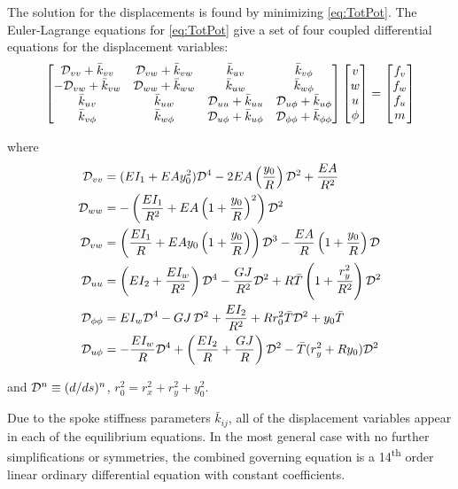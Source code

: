 \documentclass[\rootdir/thesis.tex]{subfiles}
\begin{document}
The solution for the displacements is found by minimizing \eqref{eq:TotPot}. The Euler-Lagrange equations for \eqref{eq:TotPot} give a set of four coupled differential equations for the displacement variables:
\begin{equation}
\label{eq:EulerLagrange}
\begin{bmatrix}
 \mathcal{D}_{vv} + \bar{k}_{vv} & \mathcal{D}_{vw} + \bar{k}_{vw} & \bar{k}_{uv}              & \bar{k}_{v\phi}\\
-\mathcal{D}_{vw} + \bar{k}_{vw} & \mathcal{D}_{ww} + \bar{k}_{ww} & \bar{k}_{uw}              & \bar{k}_{w\phi}\\
\bar{k}_{uv}            & \bar{k}_{uw}           & \mathcal{D}_{uu} + \bar{k}_{uu}    & \mathcal{D}_{u\phi} + \bar{k}_{u\phi}\\
\bar{k}_{v\phi}            & \bar{k}_{w\phi}           & \mathcal{D}_{u\phi} + \bar{k}_{u\phi} & \mathcal{D}_{\phi\phi} + \bar{k}_{\phi\phi}
\end{bmatrix}
\begin{bmatrix}
v\\w\\u\\\phi
\end{bmatrix}=
\begin{bmatrix}
f_v\\f_w\\f_u\\m
\end{bmatrix}
\end{equation}

where
\begin{align*}
\mathcal{D}_{vv} &= (EI_1 + EAy_0^2)\mathcal{D}^4 - 2EA\left(\frac{y_0}{R}\right)\mathcal{D}^2 + \frac{EA}{R^2}\\
\mathcal{D}_{ww} &= -\left(\frac{EI_1}{R^2} + EA\left(1+\frac{y_0}{R}\right)^2\right)\mathcal{D}^2\\
\mathcal{D}_{vw} &= \left(\frac{EI_1}{R} + EAy_0\left(1+\frac{y_0}{R}\right)\right)\mathcal{D}^3 - \frac{EA}{R}\left(1+\frac{y_0}{R}\right)\mathcal{D}\\
\mathcal{D}_{uu} &= \left(EI_2 + \frac{EI_w}{R^2}\right)\mathcal{D}^4 - \frac{GJ}{R^2}\mathcal{D}^2
    + R\bar{T}\left(1 + \frac{r_y^2}{R^2}\right)\mathcal{D}^2\\
\mathcal{D}_{\phi\phi} &= EI_w\mathcal{D}^4 - GJ\,\mathcal{D}^2 + \frac{EI_2}{R^2}
    + Rr_0^2\bar{T}\mathcal{D}^2 + y_0\bar{T}\\
\mathcal{D}_{u\phi} &= -\frac{EI_w}{R}\mathcal{D}^4 + \left(\frac{EI_2}{R} + \frac{GJ}{R}\right)\mathcal{D}^2
    - \bar{T}(r_y^2 + Ry_0)\mathcal{D}^2
\end{align*}

and $\mathcal{D}^n \equiv (d/ds)^n$, $r_0^2 = r_x^2 + r_y^2 + y_0^2$.

Due to the spoke stiffness parameters $\bar{k}_{ij}$, all of the displacement variables appear in each of the equilibrium equations. In the most general case with no further simplifications or symmetries, the combined governing equation is a 14\textsuperscript{th} order linear ordinary differential equation with constant coefficients.
\end{document}
